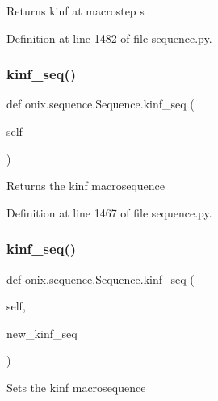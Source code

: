 \begin{DoxyVerb}Returns kinf at macrostep s\end{DoxyVerb}
 

Definition at line 1482 of file sequence.\+py.

\mbox{\label{classonix_1_1sequence_1_1Sequence_a26c2778e995e1732009b0748bc36104f}} 
\subsubsection{\texorpdfstring{kinf\+\_\+seq()}{kinf\_seq()}\hspace{0.1cm}{\footnotesize\ttfamily [1/2]}}
{\footnotesize\ttfamily def onix.\+sequence.\+Sequence.\+kinf\+\_\+seq (\begin{DoxyParamCaption}\item[{}]{self }\end{DoxyParamCaption})}

\begin{DoxyVerb}Returns the kinf macrosequence
\end{DoxyVerb}
 

Definition at line 1467 of file sequence.\+py.

\mbox{\label{classonix_1_1sequence_1_1Sequence_ab727e89adfff510786e97320d45953aa}} 
\subsubsection{\texorpdfstring{kinf\+\_\+seq()}{kinf\_seq()}\hspace{0.1cm}{\footnotesize\ttfamily [2/2]}}
{\footnotesize\ttfamily def onix.\+sequence.\+Sequence.\+kinf\+\_\+seq (\begin{DoxyParamCaption}\item[{}]{self,  }\item[{}]{new\+\_\+kinf\+\_\+seq }\end{DoxyParamCaption})}

\begin{DoxyVerb}Sets the kinf macrosequence
\end{DoxyVerb}
 


